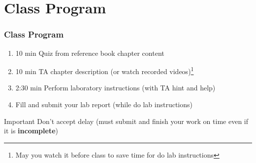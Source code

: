 \documentclass[aspectratio=169,15pt]{beamer}
\begin{document}
\section{Class Program}
\begin{frame}
    \frametitle{Class Program}
    
    \begin{enumerate}
        \item \alert{10 min} Quiz from reference book chapter content
        \item \alert{10 min} TA chapter description (or watch recorded videos)\footnote{May you watch it before class to save time for do lab instructions}
        \item \alert{2:30 min} Perform laboratory instructions (with TA hint and help)
        \item Fill and submit your lab report (while do lab instructions)
    \end{enumerate}
    \begin{alertblock}{Important}
        Don’t accept delay (must submit and finish your work on time even if it is \textbf{incomplete})
    \end{alertblock}

\end{frame}
\end{document}
